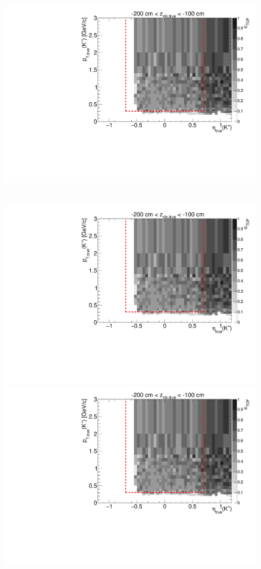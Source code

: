 \begin{figure}[hb]
{  \includegraphics[width=\linewidth,page=17]{graphics/eff/Eff2D_TOF_kaon_Plus.pdf}
}~
\parbox{0.495\textwidth}{
  \centering
  \includegraphics[width=\linewidth,page=12]{graphics/eff/Eff2D_TOF_kaon_Plus.pdf}\\
  \includegraphics[width=\linewidth,page=14]{graphics/eff/Eff2D_TOF_kaon_Plus.pdf}\\
}
\end{figure}
